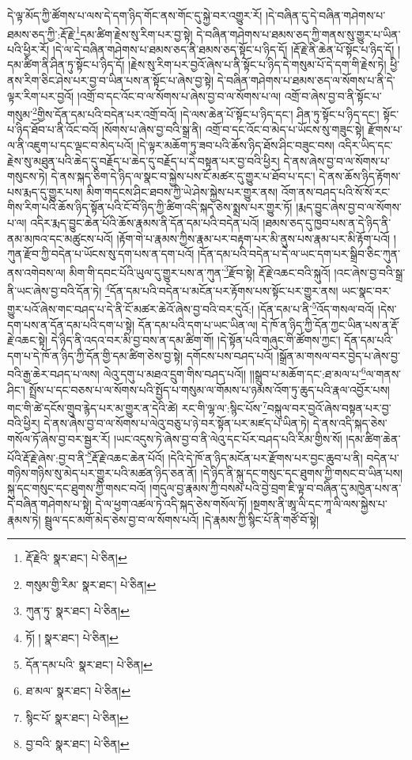 དེ་ལྟ་མོད་ཀྱི་ཚོགས་པ་ལས་དེ་དག་ཉིད་གོང་ནས་གོང་དུ་སྐྱེ་བར་འགྱུར་རོ། །དེ་བཞིན་དུ་དེ་བཞིན་གཤེགས་པ་ཐམས་ཅད་ཀྱི་:རྡོ་རྗེ་\footnote{རྡོ་རྗེའི་  སྣར་ཐང་།  པེ་ཅིན། }དམ་ཚིག་རྗེས་སུ་རིག་པར་བྱ་སྟེ། དེ་བཞིན་གཤེགས་པ་ཐམས་ཅད་ཀྱི་གནས་སུ་གྱུར་པ་ཡིན་པའི་ཕྱིར་རོ། །དེ་ལ་དེ་བཞིན་གཤེགས་པ་ཐམས་ཅད་ནི་ཐམས་ཅད་སྟོང་པ་ཉིད་དོ། །རྡོ་རྗེ་ནི་ཆེན་པོ་སྟོང་པ་ཉིད་དོ། །དམ་ཚིག་ནི་ཤིན་ཏུ་སྟོང་པ་ཉིད་དོ། །རྗེས་སུ་རིག་པར་བྱའོ་ཞེས་པ་ནི་སྟོང་པ་ཉིད་དེ་གསུམ་པོ་དེ་དག་གི་རྗེས་ཏེ། ཕྱི་ནས་རིག་ཅིང་ཤེས་པར་བྱ་བ་ཡིན་པས་ན་སྟོང་པ་ཞེས་བྱ་སྟེ། དེ་བཞིན་གཤེགས་པ་ཐམས་ཅད་ལ་སོགས་པ་ནི་དེ་ལྟར་རིག་པར་བྱའོ། །འགྲོ་བ་དང་འོང་བ་ལ་སོགས་པ་ཞེས་བྱ་བ་ལ་སོགས་པ་ལ། འགྲོ་བ་ཞེས་བྱ་བ་ནི་སྟོང་པ་གསུམ་\footnote{གསུམ་གྱི་རིམ་  སྣར་ཐང་།  པེ་ཅིན། }གྱིས་དོན་དམ་པའི་བདེན་པར་འགྲོ་བའོ། །དེ་ལས་ཆེན་པོ་སྟོང་པ་ཉིད་དང་། ཤིན་ཏུ་སྟོང་པ་ཉིད་དང་། སྟོང་པ་ཉིད་ཐོབ་པ་ནི་འོང་བའོ། །སོགས་པ་ཞེས་བྱ་བའི་སྒྲ་ནི། འགྲོ་བ་དང་འོང་བ་མེད་པ་ཡོངས་སུ་གཟུང་སྟེ། རྫོགས་པ་ལ་ནི་འཇུག་པ་དང་ལྡང་བ་མེད་པའོ། །དེ་ལྟར་མཆོག་ཏུ་ཟབ་པའི་ཆོས་ཉིད་ཐོས་ཤིང་བཟུང་བས། འདིར་ཡིད་དང་རྗེས་སུ་མཐུན་པའི་ཆེད་དུ་བརྗོད་པ་ཆེད་དུ་བརྗོད་པ་དེ་བསྟན་པར་བྱ་བའི་ཕྱིར། དེ་ནས་ཞེས་བྱ་བ་ལ་སོགས་པ་གསུངས་ཏེ། དེ་ནས་སྐད་ཅིག་དེ་ཉིད་ལ་སྣང་བ་སྐྱེས་པས་ངོ་མཚར་དུ་གྱུར་པ་ཐོབ་པ་དང་། དེ་ནས་ཆོས་ཉིད་རྟོགས་པས་རྨད་དུ་གྱུར་པས། མིག་གདངས་ཤིང་ཐབས་ཀྱི་ཡེ་ཤེས་སྐྱེས་པར་གྱུར་ནས། འོག་ནས་བཤད་པའི་སོ་སོ་རང་གིས་རིག་པའི་ཆོས་ཉིད་སྟོན་པའི་ངོ་བོ་ཉིད་ཀྱི་ཚིག་འདི་སྐད་ཅེས་སྨྲས་པར་གྱུར་ཏོ། །རྨད་བྱུང་ཞེས་བྱ་བ་ལ་སོགས་པ་ལ། འདིར་རྨད་བྱུང་ཆེན་པོའི་ཆོས་རྣམས་ནི་དོན་དམ་པའི་བདེན་པའོ། །ཐམས་ཅད་དུ་ཁྱབ་པས་ན་དེ་ཉིད་ནི་ནམ་མཁའ་དང་མཚུངས་པའོ། །རྟོག་གེ་པ་རྣམས་ཀྱིས་རྣམ་པར་བརྟག་པར་མི་ནུས་པས་རྣམ་པར་མི་རྟོག་པའོ། །ཀུན་རྫོབ་ཀྱི་བདེན་པ་ཡོངས་སུ་དག་པས་ན་དག་པའོ། །དོན་དམ་པའི་བདེན་པ་དེ་ལ་ཡང་དག་པར་སྒྲིབ་ཅིང་ཀུན་ནས་འགེབས་ལ། མིག་གི་དབང་པོའི་ཡུལ་དུ་གྱུར་པས་ན་ཀུན་\footnote{ཀུན་ཏུ་  སྣར་ཐང་།  པེ་ཅིན། }རྫོབ་སྟེ། རྡོ་རྗེ་འཆང་བའི་སྐུའོ། །འང་ཞེས་བྱ་བའི་སྒྲ་ནི་ཡང་ཞེས་བྱ་བའི་དོན་ཏེ། \footnote{ཏོ། །   སྣར་ཐང་།  པེ་ཅིན། }དོན་དམ་པའི་བདེན་པ་མངོན་པར་རྟོགས་པས་སྟོང་པར་གྱུར་ནས། ཡང་སྣང་བར་གྱུར་པའོ་ཞེས་གང་བཤད་པ་དེ་ནི་ངོ་མཚར་ཆེའོ་ཞེས་བྱ་བའི་བར་དུའོ:། །དོན་དམ་པ་ནི་\footnote{དོན་དམ་པའི་  སྣར་ཐང་།  པེ་ཅིན། }འོད་གསལ་བའོ། །དེས་དག་པས་ན་དོན་དམ་པའི་དག་པ་སྟེ། དོན་དམ་པའི་དག་པ་ཡང་ཡིན་ལ། དེ་ཁོ་ན་ཉིད་ཀྱི་དོན་ཀྱང་ཡིན་པས་ན་རྡོ་རྗེ་འཆང་སྟེ། དེ་ཉིད་ནི་འདའ་བར་མི་བྱ་བས་ན་དམ་ཚིག་གོ། །དེ་སྟོན་པའི་གཞུང་གི་ཚོགས་ཀྱང་། དོན་དམ་པའི་དག་པ་དེ་ཁོ་ན་ཉིད་ཀྱི་དོན་གྱི་དམ་ཚིག་ཅེས་བྱ་སྟེ། དགོངས་པས་བཤད་པའོ། །སྒྲོན་མ་གསལ་བར་བྱེད་པ་ཞེས་བྱ་བའི་རྒྱ་ཆེར་བཤད་པ་ལས། ལེའུ་དགུ་པ་མཐའ་དྲུག་གིས་བཤད་པའོ།། །།སྒྲུབ་པ་མཆོག་དང་:ཐ་མལ་པ་\footnote{ཐ་མལ་  སྣར་ཐང་།  པེ་ཅིན། }ལ་གནས་ཤིང་། སྤྲོས་པ་དང་བཅས་པ་ལ་སོགས་པའི་སྤྱོད་པ་གསུམ་ལ་གོམས་པ་ཉམས་འོག་ཏུ་ཆུད་པའི་རྣལ་འབྱོར་པས། གང་གི་ཚེ་དངོས་གྲུབ་རྙེད་པར་མ་གྱུར་ན་དེའི་ཚེ། རང་གི་ལྷ་ལ་:སྙིང་པོས་\footnote{སྙིང་པོ་  སྣར་ཐང་།  པེ་ཅིན། }བསྐུལ་བར་བྱའོ་ཞེས་བསྟན་པར་བྱ་བའི་ཕྱིར། དེ་ནས་ཞེས་བྱ་བ་ལ་སོགས་པ་ལེའུ་བཅུ་པ་ཉེ་བར་སྟོན་པར་མཛད་པ་ཡིན་ཏེ། དེ་ནས་འདི་སྐད་ཅེས་གསོལ་ཏོ་ཞེས་བྱ་བར་སྦྱར་རོ། །ཡང་འདུས་ཏེ་ཞེས་བྱ་བ་ནི་ལེའུ་དང་པོར་བཤད་པའི་རིམ་གྱིས་སོ། །དམ་ཚིག་ཆེན་པོའི་རྡོ་རྗེ་ཞེས་:བྱ་བ་ནི་\footnote{བྱ་བའི་  སྣར་ཐང་།  པེ་ཅིན། }རྡོ་རྗེ་འཆང་ཆེན་པོའོ། །དེའི་དེ་ཁོ་ན་ཉིད་མངོན་པར་རྫོགས་པར་བྱང་ཆུབ་པ་ནི། བདེན་པ་གཉིས་གཉིས་སུ་མེད་པར་གྱུར་པའི་མཚན་ཉིད་ཅན་ནོ། །དེ་ཉིད་ནི་སྐུ་དང་གསུང་དང་ཐུགས་ཀྱི་གསང་བ་ཡིན་པས། སྐུ་དང་གསུང་དང་ཐུགས་ཀྱི་གསང་བའོ། །གདུལ་བྱ་རྣམས་ཀྱི་བསམ་པའི་བྱེ་བྲག་ཇི་ལྟ་བ་བཞིན་དུ་མཁྱེན་པས་ན་དེ་བཞིན་གཤེགས་པ་སྟེ། དེ་ལ་ཕྱག་འཚལ་ཏེ་འདི་སྐད་ཅེས་གསོལ་ཏོ། །སྔགས་ནི་ཨཱ་ལི་དང་ཀཱ་ལི་ལས་སྐྱེས་པ་རྣམས་ཏེ། སྦྲུལ་དང་མགོ་མེད་ཅེས་བྱ་བ་ལ་སོགས་པའོ། །དེ་རྣམས་ཀྱི་སྙིང་པོ་ནི་གཙོ་བོ་སྟེ། 